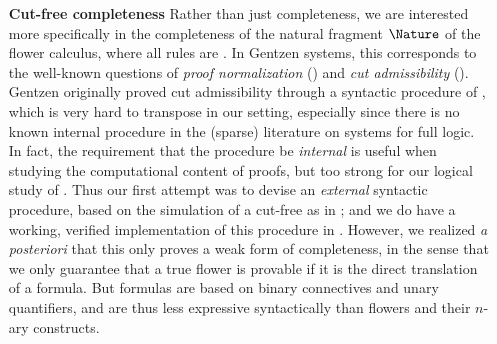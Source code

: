 \begin{itemize}
  \item[\textbf{Cut-free completeness}]
    Rather than just completeness, we are interested more specifically in the
    completeness of the natural fragment $\Nature$ of the flower calculus, where
    all rules are \emph{}. In Gentzen systems, this corresponds to
    the well-known questions of \emph{proof normalization} () and \emph{cut admissibility} (). Gentzen
    originally proved cut admissibility through a syntactic procedure of
    \emph{}, which is very hard to transpose in our  setting, especially since there is no known internal
     procedure in the (sparse) literature on  systems for full  logic. In fact, the
    requirement that the procedure be \emph{internal} is useful when studying
    the computational content of proofs, but too strong for our logical study of
    . Thus our first attempt was to devise an \emph{external}
    syntactic procedure, based on the simulation of a cut-free  as in ; and we do have a working,
    verified implementation of this procedure in 
    \cite{flowers-metatheory}. However, we realized \textit{a posteriori} that
    this only proves a weak form of completeness, in the sense that we only
    guarantee that a true flower is provable if it is the direct translation of
    a  formula. But formulas are based on binary connectives and
    unary quantifiers, and are thus less expressive syntactically than flowers
    and their $n$-ary constructs.


\end{itemize}
